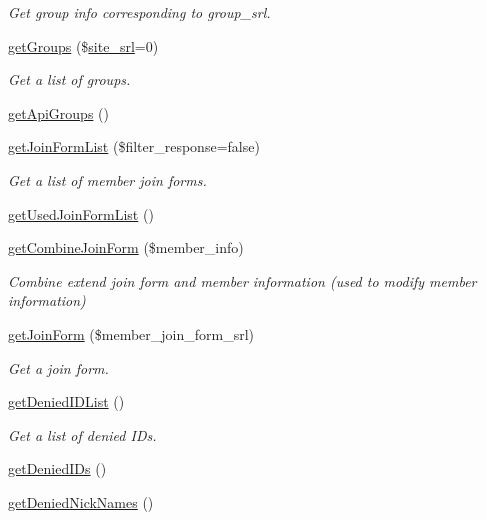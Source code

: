 \begin{DoxyCompactItemize}
\begin{DoxyCompactList}\small\item\em Get group info corresponding to group\-\_\-srl. \end{DoxyCompactList}\item 
\hyperlink{classmemberModel_a79bd0adae2d71115335afae1fc8f4e32}{get\-Groups} (\$\hyperlink{ko_8install_8php_a8b1406b4ad1048041558dce6bfe89004}{site\-\_\-srl}=0)
\begin{DoxyCompactList}\small\item\em Get a list of groups. \end{DoxyCompactList}\item 
\hyperlink{classmemberModel_a7b52f35158a9d2dc8138359fcf120b88}{get\-Api\-Groups} ()
\item 
\hyperlink{classmemberModel_af8d32c782e4637661e9379acb8ee96b1}{get\-Join\-Form\-List} (\$filter\-\_\-response=false)
\begin{DoxyCompactList}\small\item\em Get a list of member join forms. \end{DoxyCompactList}\item 
\hyperlink{classmemberModel_ab249b6e54c0b7d472d3cd50ad3b658dc}{get\-Used\-Join\-Form\-List} ()
\item 
\hyperlink{classmemberModel_a0bb14a9030332a0ab996bf545ff77de6}{get\-Combine\-Join\-Form} (\$member\-\_\-info)
\begin{DoxyCompactList}\small\item\em Combine extend join form and member information (used to modify member information) \end{DoxyCompactList}\item 
\hyperlink{classmemberModel_ad4ecb6428f8ccea4369bb7535464570e}{get\-Join\-Form} (\$member\-\_\-join\-\_\-form\-\_\-srl)
\begin{DoxyCompactList}\small\item\em Get a join form. \end{DoxyCompactList}\item 
\hyperlink{classmemberModel_ad6bb73cc72412955c289f4f695b8d0c9}{get\-Denied\-I\-D\-List} ()
\begin{DoxyCompactList}\small\item\em Get a list of denied I\-Ds. \end{DoxyCompactList}\item 
\hyperlink{classmemberModel_af8bd4c178bbae831f02b5419bc0e02ea}{get\-Denied\-I\-Ds} ()
\item 
\hyperlink{classmemberModel_ac318ffed61009f4b2d993daee7788072}{get\-Denied\-Nick\-Names} ()

\end{DoxyCompactItemize}
